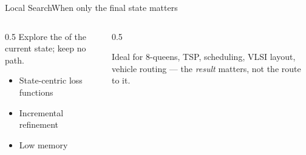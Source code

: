 \documentclass[aspectratio=169,11pt]{beamer}
\begin{document}
\begin{frame}{Local Search}{When only the final state matters}
  \begin{columns}[T]
    \begin{column}{0.5\textwidth}
      Explore the  of the current state; keep no path.
      \begin{itemize}\small
        \item State-centric loss functions
        \item Incremental refinement
        \item Low memory
      \end{itemize}
    \end{column}
    \begin{column}{0.5\textwidth}
      \begin{exampleblock}{Ideal for}
        \small 8-queens, TSP, scheduling, VLSI layout, vehicle routing —
        the \emph{result} matters, not the route to it.
      \end{exampleblock}
    \end{column}
  \end{columns}
\end{frame}
\end{document}
